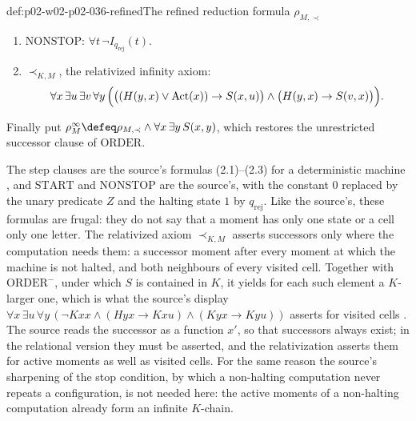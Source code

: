 \begin{hbdefinition}{def:p02-w02-p02-036-refined}{The refined reduction formula \(\rho_{M,\prec}\)}
\begin{enumerate}
\[  \]
  with \(\delta(q,a)=(q',b,L)\):
  \[
  \begin{aligned}
   &\bigl(I_q(t)\land H(t,x')\land T_a(t,x')\land S(t,t')\land S(x,x')\bigr)\\
   &\qquad\to\bigl(I_{q'}(t')\land H(t',x)\land T_b(t',x')\bigr);
  \end{aligned}
  \]
  and, for each \(a\in\mathcal A_{\mathrm{tape}}\), no change outside the
  head cell:
  \[
   \bigl(H(t,x)\land y\neq x\land T_a(t,y)\land S(t,t')\bigr)\to T_a(t',y).
  \]
\item \(\mathrm{NONSTOP}\): \(\forall t\,\neg I_{q_{\mathrm{rej}}}(t)\).
\item \(\prec_{K,M}\), the relativized infinity axiom:
  \[
   \forall x\,\exists u\,\exists v\,\forall y\,
   \Bigl(\bigl((H(y,x)\lor\mathrm{Act}(x))\to S(x,u)\bigr)\land
   \bigl(H(y,x)\to S(v,x)\bigr)\Bigr).
  \]
\end{enumerate}
Finally put \(\rho^{\infty}_{M}\defeq\rho_{M,\prec}\land
\forall x\,\exists y\,S(x,y)\), which restores the unrestricted successor
clause of \(\mathrm{ORDER}\).
\end{hbdefinition}

The step clauses are the source's formulas (2.1)--(2.3) for a deterministic
machine \cite[Sect.~2.1.1, pp.~20--21]{BorgerGradelGurevich1997}, and
\(\mathrm{START}\) and \(\mathrm{NONSTOP}\) are the source's, with the constant
\(0\) replaced by the unary predicate \(Z\) and the halting state \(1\) by
\(q_{\mathrm{rej}}\).  Like the source's, these formulas are frugal: they do
not say that a moment has only one state or a cell only one letter.  The
relativized axiom \(\prec_{K,M}\) asserts successors only where the
computation needs them: a successor moment after every moment at which the
machine is not halted, and both neighbours of every visited cell.  Together
with \(\mathrm{ORDER}^{-}\), under which \(S\) is contained in \(K\), it
yields for each such element a \(K\)-larger one, which is what the source's
display \(\forall x\,\exists u\,\forall y\,(\neg Kxx\land(Hyx\to Kxu)\land
(Kyx\to Kyu))\) asserts for visited cells
\cite[Sect.~2.1.2, p.~35]{BorgerGradelGurevich1997}.  The source reads the
successor as a function \(x'\), so that successors always exist; in the
relational version they must be asserted, and the relativization asserts
them for active moments as well as visited cells.  For the same reason the
source's sharpening of the stop condition, by which a non-halting computation
never repeats a configuration, is not needed here: the active moments of a
non-halting computation already form an infinite \(K\)-chain.

